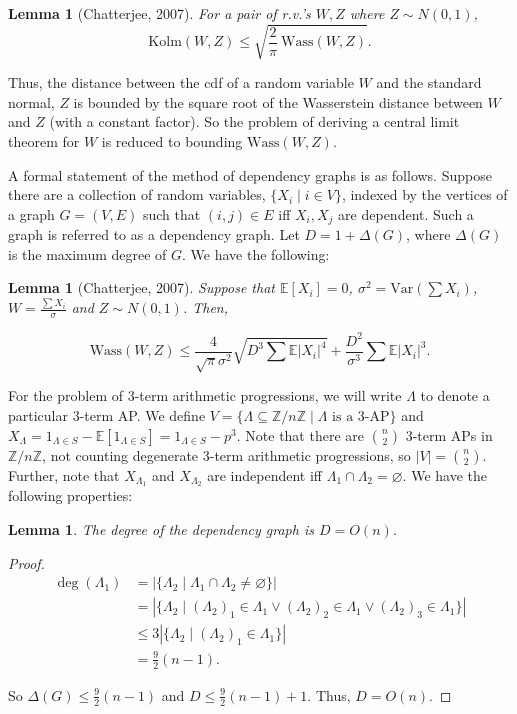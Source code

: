 \documentclass[12pt]{article} %
\newcommand{\abs}[1]{\left\lvert#1\right\rvert}
\newcommand{\Var}{\mathrm{Var}}
\newcommand{\Wass}{\mathrm{Wass}}
\newcommand{\Kolm}{\mathrm{Kolm}}
\newcommand{\E}{\mathbb{E}}
\newcommand{\Z}{\mathbb{Z}}
\newtheorem{lem}[thm]{Lemma}
\theoremstyle{definition}
\theoremstyle{definition}
\begin{document}
\begin{lem}[Chatterjee, 2007]
\label{lem:wass-kolm}
For a pair of r.v.'s $W, Z$ where $Z \sim N(0, 1)$,
$$ \Kolm(W, Z) \leq \sqrt{\frac{2}{\pi}\ \Wass(W, Z)}. $$
\end{lem}

Thus, the distance between the cdf of a random variable $W$ and the standard normal, $Z$ is bounded by the square root of the Wasserstein distance between $W$ and $Z$ (with a constant factor). So the problem of deriving a central limit theorem for $W$ is reduced to bounding $\Wass(W, Z)$.

A formal statement of the method of dependency graphs is as follows. Suppose there are a collection of random variables, $\{X_i \mid i \in V\}$, indexed by the vertices of a graph $G = (V,E)$ such that $(i, j) \in E$ iff $X_i, X_j$ are dependent. Such a graph is referred to as a dependency graph. Let $D = 1 + \Delta(G)$, where $\Delta(G)$ is the maximum degree of $G$. We have the following:

\begin{lem}[Chatterjee, 2007]
\label{lem:wass-dep-graph}
Suppose that $\E[X_i] = 0$, $\sigma^2 = \Var(\sum {X_i})$, $W = \frac{\sum X_i}{\sigma}$ and $Z \sim N(0,1)$. Then,

$$ \Wass(W, Z) \leq \frac{4}{\sqrt{\pi}\sigma^2} \sqrt{D^3 \sum {\E{|X_i|}^4}} 
+ \frac{D^2}{\sigma^3} \sum {\E{|X_i|}^3}. $$

\end{lem}

For the problem of 3-term arithmetic progressions, we will write $\Lambda$ to denote a particular 3-term AP. We define $V = \{\Lambda \subseteq \Z /n\Z \mid \Lambda \text{ is a 3-AP}\}$ and $X_\Lambda = 1_{\Lambda \in S} - \E[1_{\Lambda \in S}] = 1_{\Lambda \in S} - p^3$. Note that there are $\binom{n}{2}$ 3-term APs in $\Z / n\Z$, not counting degenerate 3-term arithmetic progressions, so $|V| = \binom{n}{2}$. Further, note that $X_{\Lambda_1}$ and $X_{\Lambda_2}$ are independent iff $\Lambda_1 \cap \Lambda_2 = \varnothing$. We have the following properties:

\begin{lem}
The degree of the dependency graph is $D = O(n)$.
\end{lem}

\begin{proof}

\begin{align*}
\deg(\Lambda_1) &= \abs{\{ \Lambda_2 \mid \Lambda_1 \cap \Lambda_2 \neq \varnothing \}} \\
&= \abs{\{ \Lambda_2 \mid (\Lambda_2)_1 \in \Lambda_1 \lor (\Lambda_2)_2 \in \Lambda_1 \lor (\Lambda_2)_3 \in \Lambda_1\}} \\
&\leq 3\abs{\{ \Lambda_2 \mid (\Lambda_2)_1 \in \Lambda_1 \}} \\
&= \frac{9}{2}(n-1).
\end{align*}

So $\Delta(G) \leq \frac{9}{2}(n-1)$ and $D \leq \frac{9}{2}(n-1)+1$. Thus, $D = O(n)$.
\end{proof}
\end{document}
